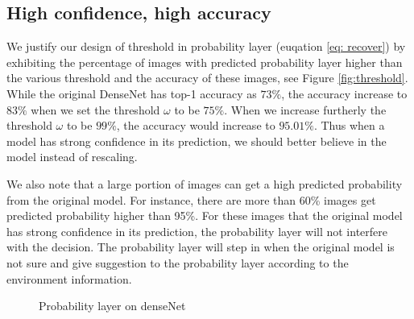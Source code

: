 \documentclass[pageno]{jpaper}
\begin{document}
\subsection{High confidence, high accuracy}
We justify our design of threshold in probability layer (euqation \ref{eq: recover}) by exhibiting the percentage of images with predicted probability layer higher than the various threshold and the accuracy of these images, see Figure \ref{fig:threshold}. While the original DenseNet has top-1 accuracy as $73\%$, the accuracy increase to $83\%$ when we set the threshold $\omega$ to be $75\%$. When we increase furtherly the threshold $\omega$ to be $99\%$, the accuracy would increase to $95.01\%$. Thus when a model has strong confidence in its prediction, we should better believe in the model instead of rescaling. 

We also note that a large portion of images can get a high predicted probability from the original model. For instance, there are more than 60\% images get predicted probability higher than 95\%. For these images that the original model has strong confidence in its prediction, the probability layer will not interfere with the decision. The probability layer will step in when the original model is not sure and give suggestion to the probability layer according to the environment information. 




   \begin{figure}
     \hfill
     \caption{Probability layer on denseNet}\label{fig:complex}
   \end{figure}
\end{document}
